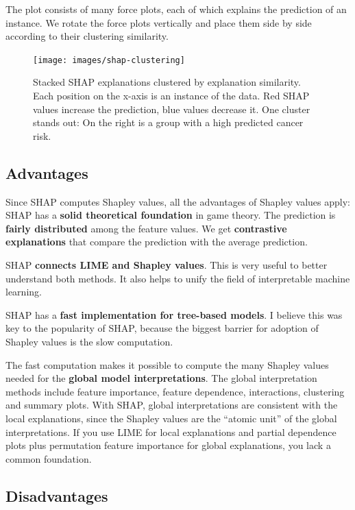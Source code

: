 \documentclass[
  10pt,
]{scrbook}
\begin{document}
The plot consists of many force plots, each of which explains the prediction of an instance.
We rotate the force plots vertically and place them side by side according to their clustering similarity.

\begin{figure}

{\centering \texttt{[image: images/shap-clustering]} 

}

\caption{Stacked SHAP explanations clustered by explanation similarity. Each position on the x-axis is an instance of the data. Red SHAP values increase the prediction, blue values decrease it. One cluster stands out: On the right is a group with a high predicted cancer risk.}\label{fig:unnamed-chunk-49}
\end{figure}

\hypertarget{advantages-17}{%
\subsection{Advantages}\label{advantages-17}}

Since SHAP computes Shapley values, all the advantages of Shapley values apply:
SHAP has a \textbf{solid theoretical foundation} in game theory.
The prediction is \textbf{fairly distributed} among the feature values.
We get \textbf{contrastive explanations} that compare the prediction with the average prediction.

SHAP \textbf{connects LIME and Shapley values}.
This is very useful to better understand both methods.
It also helps to unify the field of interpretable machine learning.

SHAP has a \textbf{fast implementation for tree-based models}.
I believe this was key to the popularity of SHAP, because the biggest barrier for adoption of Shapley values is the slow computation.

The fast computation makes it possible to compute the many Shapley values needed for the \textbf{global model interpretations}.
The global interpretation methods include feature importance, feature dependence, interactions, clustering and summary plots.
With SHAP, global interpretations are consistent with the local explanations, since the Shapley values are the ``atomic unit'' of the global interpretations.
If you use LIME for local explanations and partial dependence plots plus permutation feature importance for global explanations, you lack a common foundation.

\hypertarget{disadvantages-17}{%
\subsection{Disadvantages}\label{disadvantages-17}}
\end{document}

